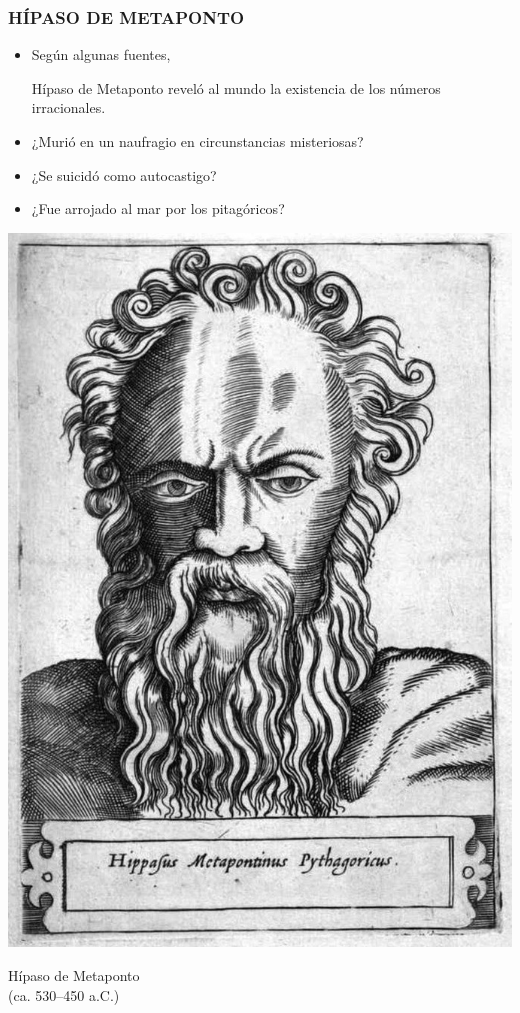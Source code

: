 \begin{frame}
  \frametitle{HÍPASO DE METAPONTO}

  \begin{minipage}[t][0.6\textheight]{0.6\textwidth}
    \vspace{0pt}
    \begin{itemize}
    \item<2-> Según algunas fuentes,

      Hípaso de Metaponto reveló al mundo la
      existencia de los números irracionales.

    \item<3-> ¿Murió en un naufragio en circunstancias misteriosas?

    \item<4-> ¿Se suicidó como autocastigo?

    \item<5-> ¿Fue arrojado al mar por los pitagóricos?
    \end{itemize}

  \end{minipage}
  \begin{minipage}[t]{0.35\textwidth}
    \vspace{0pt}\flushright
        \includegraphics[width=.9\textwidth]{hipaso.jpg}

        Hípaso de Metaponto\\
        (ca. 530--450 a.C.)
  \end{minipage}
\end{frame}

